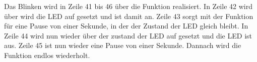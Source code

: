 Das Blinken wird in Zeile 41 bis 46 über die  Funktion realisiert.
In Zeile 42 wird über  wird die LED auf  gesetzt und ist damit an.
Zeile 43 sorgt mit der Funktion  für eine Pause von einer Sekunde, in der der Zustand der LED gleich bleibt.
In Zeile 44 wird nun wieder über  der zustand der LED auf  gesetzt und die LED ist aus.
Zeile 45 ist nun wieder eine Pause von einer Sekunde. Dannach wird die  Funktion endlos wiederholt. 








